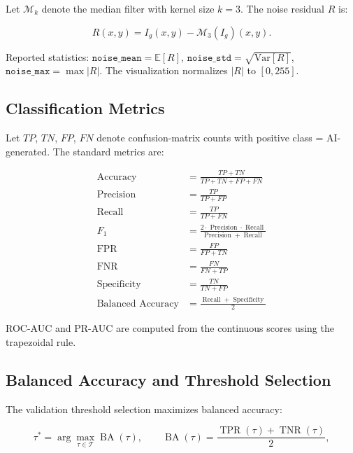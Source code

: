 \documentclass[10pt,conference,compsoc]{IEEEtran}
\begin{document}
Let $\mathcal{M}_k$ denote the median filter with kernel size $k=3$.
The noise residual $R$ is:

\begin{equation}
R(x,y) = I_g(x,y) - \mathcal{M}_3(I_g)(x,y).
\label{eq:noise-residual}
\end{equation}

Reported statistics: $\texttt{noise\_mean} = \mathbb{E}[R]$, $\texttt{noise\_std} = \sqrt{\mathrm{Var}[R]}$, $\texttt{noise\_max} = \max |R|$.
The visualization normalizes $|R|$ to $[0, 255]$.

\subsection{Classification Metrics}
\label{sec:math-metrics}

Let $TP$, $TN$, $FP$, $FN$ denote confusion-matrix counts with positive class = AI-generated.
The standard metrics are:

\begin{align}
\operatorname{Accuracy} &= \frac{TP + TN}{TP + TN + FP + FN} \\
\operatorname{Precision} &= \frac{TP}{TP + FP} \\
\operatorname{Recall} &= \frac{TP}{TP + FN} \\
F_1 &= \frac{2 \cdot \operatorname{Precision} \cdot \operatorname{Recall}}{\operatorname{Precision} + \operatorname{Recall}} \\
\operatorname{FPR} &= \frac{FP}{FP + TN} \\
\operatorname{FNR} &= \frac{FN}{FN + TP} \\
\operatorname{Specificity} &= \frac{TN}{TN + FP} \\
\operatorname{Balanced~Accuracy} &= \frac{\operatorname{Recall} + \operatorname{Specificity}}{2}
\label{eq:metrics}
\end{align}

ROC-AUC and PR-AUC are computed from the continuous scores using the trapezoidal rule.

\subsection{Balanced Accuracy and Threshold Selection}
\label{sec:math-threshold}

The validation threshold selection maximizes balanced accuracy:

\begin{equation}
\tau^* = \arg\max_{\tau \in \mathcal{T}} \operatorname{BA}(\tau),
\qquad \operatorname{BA}(\tau) = \frac{\operatorname{TPR}(\tau) + \operatorname{TNR}(\tau)}{2},
\label{eq:ba}
\end{equation}
\end{document}
